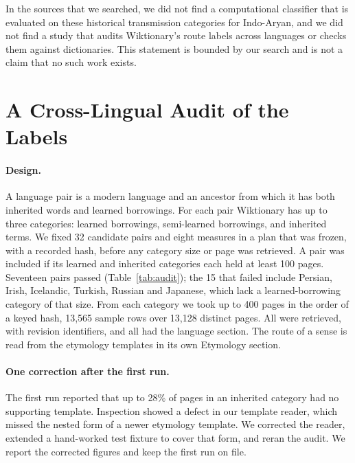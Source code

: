 \documentclass[11pt]{article}
\begin{document}
In the sources that we searched, we did not find a computational classifier that is evaluated on these historical transmission categories for Indo-Aryan, and we did not find a study that audits Wiktionary's route labels across languages or checks them against dictionaries. This statement is bounded by our search and is not a claim that no such work exists.

\section{A Cross-Lingual Audit of the Labels}
\label{sec:audit}

\paragraph{Design.} A language pair is a modern language and an ancestor from which it has both inherited words and learned borrowings. For each pair Wiktionary has up to three categories: learned borrowings, semi-learned borrowings, and inherited terms. We fixed 32 candidate pairs and eight measures in a plan that was frozen, with a recorded hash, before any category size or page was retrieved. A pair was included if its learned and inherited categories each held at least 100 pages. Seventeen pairs passed (Table~\ref{tab:audit}); the 15 that failed include Persian, Irish, Icelandic, Turkish, Russian and Japanese, which lack a learned-borrowing category of that size. From each category we took up to 400 pages in the order of a keyed hash, 13,565 sample rows over 13,128 distinct pages. All were retrieved, with revision identifiers, and all had the language section. The route of a sense is read from the etymology templates in its own Etymology section.

\paragraph{One correction after the first run.} The first run reported that up to 28\% of pages in an inherited category had no supporting template. Inspection showed a defect in our template reader, which missed the nested form of a newer etymology template. We corrected the reader, extended a hand-worked test fixture to cover that form, and reran the audit. We report the corrected figures and keep the first run on file.
\end{document}
